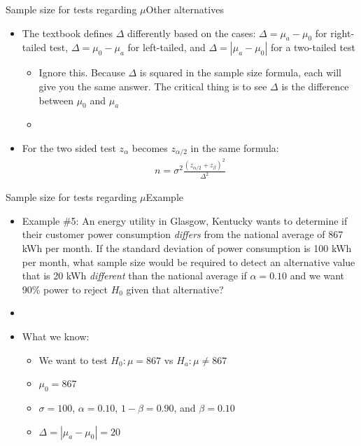 \documentclass[xcolor=dvipsnames]{beamer}
\begin{document}
\begin{frame}{Sample size for tests regarding $\mu$}{Other alternatives}
	\begin{itemize}
		\item The textbook defines $\Delta$ differently based on the cases: $\Delta = \mu_a - \mu_0$ for right-tailed test, $\Delta = \mu_0 - \mu_a$ for left-tailed, and $\Delta = |\mu_a - \mu_0|$ for a two-tailed test
		\begin{itemize}
			\item Ignore this. Because $\Delta$ is squared in the sample size formula, each will give you the same answer. The critical thing is to see $\Delta$ is the difference between $\mu_0$ and $\mu_a$
			\item[]
		\end{itemize}
	\item For the two sided test $z_{\alpha}$ becomes $z_{\alpha/2}$ in the same formula:
	\begin{gather*}
		n = \sigma^2\frac{(z_{\alpha/2} + z_{\beta})^2}{\Delta^2}
	\end{gather*}
	\end{itemize}
\end{frame}

\begin{frame}{Sample size for tests regarding $\mu$}{Example}
	\begin{itemize}
		\item Example \#5: An energy utility in Glasgow, Kentucky wants to determine if their customer power consumption \emph{differs} from the national average of 867 kWh per month. If the standard deviation of power consumption is 100 kWh per month, what sample size would be required to detect an alternative value that is 20 kWh \emph{different} than the national average if $\alpha = 0.10$ and we want 90\% power to reject $H_0$ given that alternative?
		\item[]
		\item What we know:
		\begin{itemize}
			\item We want to test $H_0: \mu = 867$ vs $H_a: \mu \neq 867$
			\item $\mu_0 = 867$
			\item $\sigma = 100$, $\alpha = 0.10$, $1-\beta = 0.90$, and $\beta = 0.10$
			\item $\Delta = |\mu_a - \mu_0| = 20$
		\end{itemize}
	\end{itemize}
\end{frame}
\end{document}
